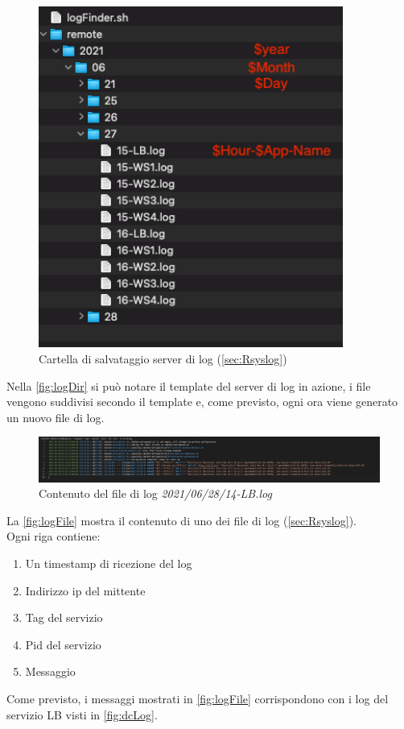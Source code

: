 \documentclass[../DocumentazioneProgetto.tex]{subfiles}
\begin{document}
	\begin{figure}[ht]
		\includegraphics[width=10cm]{images/logDir.png}
		\centering
		\caption{Cartella di salvataggio server di log (\autoref{sec:Rsyslog})}
		\label{fig:logDir}
	\end{figure}
	Nella \autoref{fig:logDir} si può notare il template del server di log in azione, i file vengono suddivisi secondo il template e, come previsto, ogni ora viene generato un nuovo file di log.

	\begin{figure}[ht]
		\includegraphics[width=15cm]{images/logFile.png}
		\centering
		\caption{Contenuto del file di log \textit{2021/06/28/14-LB.log}}
		\label{fig:logFile}
	\end{figure}
	La \autoref{fig:logFile} mostra il contenuto di uno dei file di log (\autoref{sec:Rsyslog}).\\
	Ogni riga contiene:
	\begin{enumerate}
		\item Un timestamp di ricezione del log
		\item Indirizzo ip del mittente
		\item Tag del servizio
		\item Pid del servizio
		\item Messaggio
	\end{enumerate}
	Come previsto, i messaggi mostrati in \autoref{fig:logFile} corrispondono con i log del servizio LB visti in \autoref{fig:dcLog}.
\end{document}
